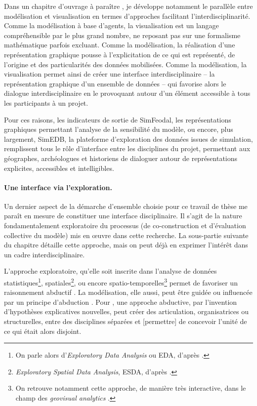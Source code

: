 Dans un chapitre d'ouvrage à paraître \autocite{cura_visualisation_2020}, je développe notamment le parallèle entre modélisation et visualisation en termes d'approches facilitant l'interdisciplinarité.
Comme la modélisation à base d'agents, la visualisation est un \og langage\fg{} compréhensible par le plus grand nombre, ne reposant pas sur une formalisme mathématique parfois excluant.
Comme la modélisation, la réalisation d'une représentation graphique pousse à l'explicitation de ce qui est représenté, de l'origine et des particularités des données mobilisées.
Comme la modélisation, la visualisation permet ainsi de créer une interface interdisciplinaire -- la représentation graphique d'un ensemble de données --  qui favorise alors le dialogue interdisciplinaire en le provoquant autour d'un élément accessible à tous les participants à un projet.

Pour ces raisons, les indicateurs de sortie de SimFeodal, les représentations graphiques permettant l'analyse de la sensibilité du modèle, ou encore, plus largement, SimEDB, la plateforme d'exploration des données issues de simulation, remplissent tous le rôle d'interface entre les disciplines du projet, permettant aux géographes, archéologues et historiens de dialoguer autour de représentations explicites, accessibles et intelligibles.


\paragraph{Une interface via l'exploration.}

Un dernier aspect de la démarche d'ensemble choisie pour ce travail de thèse me paraît en mesure de constituer une interface disciplinaire.
Il s'agit de la nature fondamentalement exploratoire du processus (de co-construction et d'évaluation collective du modèle) mis en œuvre dans cette recherche.
La sous-partie suivante du chapitre détaille cette approche, mais on peut déjà en exprimer l'intérêt dans un cadre interdisciplinaire.

L'approche exploratoire, qu'elle soit inscrite dans l'analyse de données  statistiques\footnote{
On parle alors d'\textit{Exploratory Data Analysis} ou \og EDA\fg{}, d'après \textcite{tukey_exploratory_1977}.
}, spatiales\footnote{
\textit{Exploratory Spatial Data Analysis}, \og ESDA\fg{}, d'après \textcites{brunsdon_exploratory_1998,haining_exploratory_1998}.
}, ou encore spatio-temporelles\footnote{
	On retrouve notamment cette approche, de manière très interactive, dans le champ des \textit{geovisual analytics} \autocite{andrienko_exploratory_2006}.
} permet de favoriser un raisonnement abductif \autocite{banos2005voie}.
La modélisation, elle aussi, peut être guidée ou influencée par un principe d'abduction \autocite[77]{banos_pour_2013}.
Pour \textcite{morin1994interdisciplinarite}, une approche abductive, par \og l'invention d'hypothèses explicatives nouvelles\fg{}, peut créer \og des articulation, organisatrices ou structurelles, entre des disciplines séparées et [permettre] de concevoir l'unité de ce qui était alors disjoint\fg{}.

